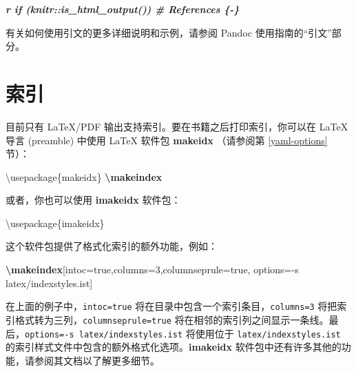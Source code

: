 \documentclass[
  12pt,
]{krantz}
\newenvironment{Shaded}{\begin{snugshade}}{\end{snugshade}}
\newcommand{\BuiltInTok}[1]{#1}
\newcommand{\ExtensionTok}[1]{#1}
\newcommand{\FunctionTok}[1]{\textcolor[rgb]{0.13,0.29,0.53}{\textbf{#1}}}
\newcommand{\InformationTok}[1]{\textcolor[rgb]{0.56,0.35,0.01}{\textbf{\textit{#1}}}}
\newcommand{\NormalTok}[1]{#1}
\theoremstyle{definition}
\theoremstyle{definition}
\theoremstyle{definition}
\theoremstyle{definition}
\theoremstyle{remark}
\begin{document}
\begin{Shaded}
\begin{Highlighting}[]
\InformationTok{\textasciigrave{}r if (knitr::is\_html\_output()) \textquotesingle{}\# References \{{-}\}\textquotesingle{}\textasciigrave{}}
\end{Highlighting}
\end{Shaded}

有关如何使用引文的更多详细说明和示例，请参阅 Pandoc 使用指南的``引文''部分。

\hypertarget{latex-index}{%
\section{索引}\label{latex-index}}

目前只有 LaTeX/PDF 输出支持索引。要在书籍之后打印索引，你可以在 LaTeX 导言 (preamble) 中使用 LaTeX 软件包 \textbf{makeidx} （请参阅第 \ref{yaml-options} 节）：

\begin{Shaded}
\begin{Highlighting}[]
\BuiltInTok{\textbackslash{}usepackage}\NormalTok{\{}\ExtensionTok{makeidx}\NormalTok{\}}
\FunctionTok{\textbackslash{}makeindex}
\end{Highlighting}
\end{Shaded}

或者，你也可以使用 \textbf{imakeidx} 软件包：

\begin{Shaded}
\begin{Highlighting}[]
\BuiltInTok{\textbackslash{}usepackage}\NormalTok{\{}\ExtensionTok{imakeidx}\NormalTok{\}}
\end{Highlighting}
\end{Shaded}

这个软件包提供了格式化索引的额外功能，例如：

\begin{Shaded}
\begin{Highlighting}[]
\FunctionTok{\textbackslash{}makeindex}\NormalTok{[intoc=true,columns=3,columnseprule=true,}
\NormalTok{           options={-}s latex/indexstyles.ist]}
\end{Highlighting}
\end{Shaded}

在上面的例子中，\texttt{intoc=true} 将在目录中包含一个索引条目，\texttt{columns=3} 将把索引格式转为三列，\texttt{columnseprule=true} 将在相邻的索引列之间显示一条线。最后，\texttt{options=-s\ latex/indexstyles.ist} 将使用位于 \texttt{latex/indexstyles.ist} 的索引样式文件中包含的额外格式化选项。\textbf{imakeidx} 软件包中还有许多其他的功能，请参阅其文档以了解更多细节。
\end{document}
